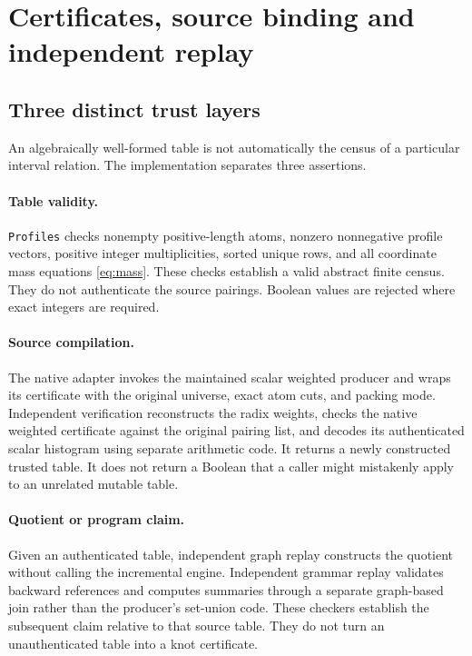 \section{Certificates, source binding and independent replay}
\label{sec:certificates}

\subsection{Three distinct trust layers}

An algebraically well-formed table is not automatically the census of a
particular interval relation. The implementation separates three assertions.

\paragraph{Table validity.}
\texttt{Profiles} checks nonempty positive-length atoms, nonzero nonnegative
profile vectors, positive integer multiplicities, sorted unique rows, and
all coordinate mass equations \eqref{eq:mass}. These checks establish a
valid abstract finite census. They do not authenticate the source pairings.
Boolean values are rejected where exact integers are required.

\paragraph{Source compilation.}
The native adapter invokes the maintained scalar weighted producer and
wraps its certificate with the original universe, exact atom cuts, and
packing mode. Independent verification reconstructs the radix weights,
checks the native weighted certificate against the original pairing list,
and decodes its authenticated scalar histogram using separate arithmetic
code. It returns a newly constructed trusted table. It does not return a
Boolean that a caller might mistakenly apply to an unrelated mutable table.

\paragraph{Quotient or program claim.}
Given an authenticated table, independent graph replay constructs the
quotient without calling the incremental engine. Independent grammar replay
validates backward references and computes summaries through a separate
graph-based join rather than the producer's set-union code. These checkers
establish the subsequent claim relative to that source table. They do not
turn an unauthenticated table into a knot certificate.

